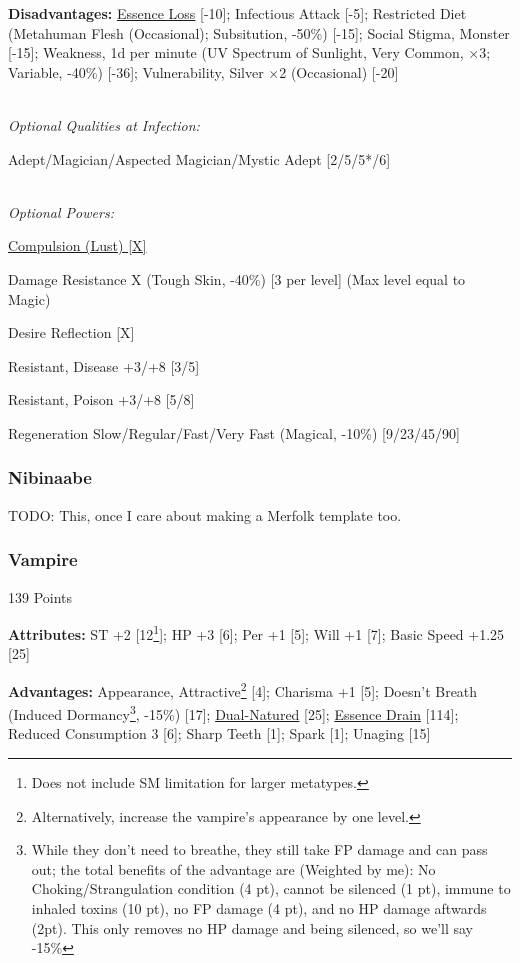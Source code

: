 \begin{multicols*}{3}
	\textbf{Disadvantages:}	
	\hyperref[essence_loss]{Essence Loss} [-10]; Infectious Attack [-5]; Restricted Diet (Metahuman Flesh (Occasional); Subsitution, -50\%) [-15]; Social Stigma, Monster [-15]; Weakness, 1d per minute (UV Spectrum of Sunlight, Very Common, $\times$3; Variable, -40\%) [-36]; Vulnerability, Silver $\times$2 (Occasional) [-20]
	
	\textit{\\Optional Qualities at Infection:}
	
	Adept/Magician/Aspected Magician/Mystic Adept [2/5/5*/6]
	
	\textit{\\Optional Powers:}
	
	\hyperref[compulsion]{Compulsion (Lust) [X]}
	
	Damage Resistance X (Tough Skin, -40\%) [3 per level] (Max level equal to Magic)
	
	Desire Reflection [X]
	
	Resistant, Disease +3/+8 [3/5]
	
	Resistant, Poison +3/+8 [5/8]	
	
	Regeneration Slow/Regular/Fast/Very Fast (Magical, -10\%) [9/23/45/90]
	
	\subsubsection{Nibinaabe}\label{nibinaabe}
	TODO: This, once I care about making a Merfolk template too.
	
	\subsubsection{Vampire}\label{vampire}
	\begin{flushright}
		139 Points
	\end{flushright}
	
	\textbf{Attributes:}
	ST +2 [12\footnote{Does not include SM limitation for larger metatypes.}]; HP +3 [6]; Per +1 [5]; Will +1 [7]; Basic Speed +1.25 [25]
	
	\textbf{Advantages:}
	Appearance, Attractive\footnote{Alternatively, increase the vampire's appearance by one level.} [4]; Charisma +1 [5]; Doesn't Breath (Induced Dormancy\footnote{While they don't need to breathe, they still take FP damage and can pass out; the total benefits of the advantage are (Weighted by me): No Choking/Strangulation condition (4 pt), cannot be silenced (1 pt), immune to inhaled toxins (10 pt), no FP damage (4 pt), and no HP damage aftwards (2pt). This only removes no HP damage and being silenced, so we'll say -15\%}, -15\%) [17]; \hyperref[dual_natured]{Dual-Natured} [25];  \hyperref[essence_drain]{Essence Drain} [114]; Reduced Consumption 3 [6]; Sharp Teeth [1]; Spark [1]; Unaging [15]
		

\end{multicols*}
